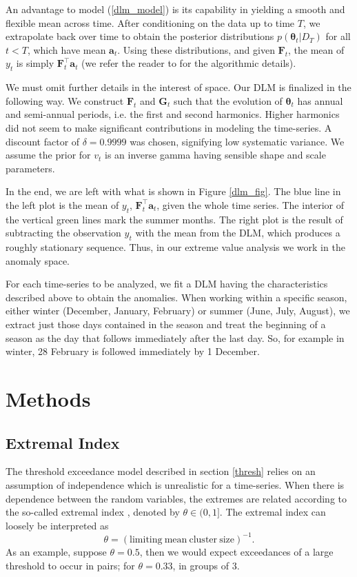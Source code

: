 \documentclass[12pt]{article}
\newcommand{\m}[1]{\mathbf{\bm{#1}}}
\begin{document}
An advantage to model (\ref{dlm_model}) is its capability in yielding a smooth and flexible mean across time. After conditioning on the data up to time $T$, we extrapolate back over time to obtain the posterior distributions $p(\m{\theta}_t|D_T)$ for all $t<T$, which have mean $\m{a}_t$. Using these distributions, and given $\m{F}_t$, the mean of $y_t$ is simply $\m{F}_t^\top\m{a}_t$ (we refer the reader to \cite{prado2010time} for the algorithmic details).

We must omit further details in the interest of space. Our DLM is finalized in the following way. We construct $\m{F}_t$ and $\m{G}_t$ such that the evolution of $\m{\theta}_t$ has annual and semi-annual periods, i.e. the first and second harmonics. Higher harmonics did not seem to make significant contributions in modeling the time-series. A discount factor of $\delta=0.9999$ was chosen, signifying low systematic variance. We assume the prior for $v_t$ is an inverse gamma having sensible shape and scale parameters.

In the end, we are left with what is shown in Figure \ref{dlm_fig}. The blue line in the left plot is the mean of $y_t$, $\m{F}_t^\top\m{a}_t$, given the whole time series. The interior of the vertical green lines mark the summer months. The right plot is the result of subtracting the observation $y_t$ with the mean from the DLM, which produces a roughly stationary sequence. Thus, in our extreme value analysis we work in the anomaly space.

For each time-series to be analyzed, we fit a DLM having the characteristics described above to obtain the anomalies. When working within a specific season, either winter (December, January, February) or summer (June, July, August), we extract just those days contained in the season and treat the beginning of a season as the day that follows immediately after the last day. So, for example in winter, 28 February is followed immediately by 1 December.


\section{Methods}

\subsection{Extremal Index}
\label{index}

The threshold exceedance model described in section \ref{thresh} relies on an assumption of independence which is unrealistic for a time-series. When there is dependence between the random variables, the extremes are related according to the so-called extremal index \citep{leadbetter1983extremes}, denoted by $\theta\in(0,1]$. The extremal index can loosely be interpreted as
\[ \theta = (\mathrm{limiting~mean~cluster~size})^{-1}. \]
As an example, suppose $\theta=0.5$, then we would expect exceedances of a large threshold to occur in pairs; for $\theta=0.33$, in groups of 3.
\end{document}
